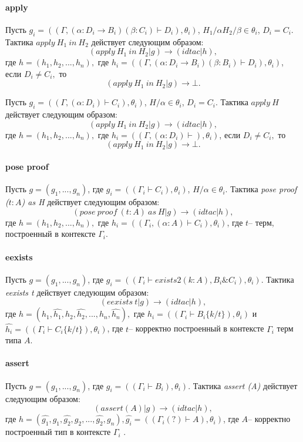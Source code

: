 \documentclass[12pt]{article}
\begin{document}
\paragraph{apply}

Пусть $g_i = ((\Gamma, (\alpha:  D_i \xrightarrow{} B_i) (\beta: C_i) \vdash D_i), \theta_i)$, $H_1/\alpha H_2/\beta \in \theta_i$, $D_i = C_i$.
Тактика $apply\ H_1\ in\ H_2$ действует следующим образом:
$$(apply\ H_1\ in\ H_2|g) \xrightarrow{} (idtac| h),$$
где $h=(h_1,h_2,...,h_n),$ где $h_i= ((\Gamma, (\alpha:  D_i \xrightarrow{} B_i) (\beta: B_i) \vdash D_i), \theta_i)$,
если $D_i \neq C_i,$ то
$$(apply\ H_1\ in\ H_2|g) \xrightarrow{} \bot.$$

Пусть $g_i = ((\Gamma, (\alpha:  D_i) \vdash C_i), \theta_i)$, $H/\alpha \in \theta_i$, $D_i = C_i$.
Тактика $apply\ H$ действует следующим образом:
$$(apply\ H_1\ in\ H_2|g) \xrightarrow{} (idtac| h),$$
где $h=(h_1,h_2,...,h_n),$ где $h_i= ((\Gamma, (\alpha:  D_i) \vdash), \theta_i)$,
если $D_i \neq C_i,$ то
$$(apply\ H_1\ in\ H_2|g) \xrightarrow{} \bot.$$

\paragraph{pose proof}

Пусть $g = (g_1, ..., g_n)$, где $g_i = ((\Gamma_i \vdash C_i), \theta_i)$, $H/\alpha \in \theta_i$.
Тактика \textit{pose proof ($t:A$) as H}  действует следующим образом:
$$(pose\ proof\ (t:A)\ as\ H|g) \xrightarrow{} (idtac| h),$$ 
где $h=(h_1,h_2,...,h_n),$ где $h_i= ((\Gamma_i, (\alpha: A) \vdash C_i), \theta_i)$, где $t$-- терм, построенный в контексте $\Gamma_i$.

\paragraph{eexists}
Пусть $g = (g_1, ..., g_n)$, где $g_i = ((\Gamma_i \vdash exists2 (k : A), B_i \& C_i), \theta_i)$.
Тактика \textit{eexists t}  действует следующим образом:
$$(eexists\ t|g) \xrightarrow{} (idtac| h),$$ 
где $h=(h_1, \hat{h_1}, h_2,\hat{h_2},...,h_n,\hat{h_n}),$ где $h_i= ((\Gamma_i \vdash B_i\{k/t\}), \theta_i)$ и $\hat{h_i}= ((\Gamma_i \vdash C_i\{k/t\}), \theta_i)$, где $t$-- корректно построенный в контексте $\Gamma_i$ терм типа $A$.

\paragraph{assert}
Пусть $g = (g_1, ..., g_n)$, где $g_i = ((\Gamma_i \vdash B_i), \theta_i)$.
Тактика \textit{assert (A)}  действует следующим образом:
$$(assert (A)|g) \xrightarrow{} (idtac| h),$$ 
где $h=(\hat{g_1},g_1,\hat{g_2},g_2,...,\hat{g_2},g_n), \hat{g_i} = ((\Gamma_i(?) \vdash A), \theta_i)$, где $A$-- корректно построенный тип в контексте $\Gamma_i$ .
\end{document}
